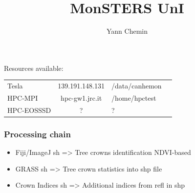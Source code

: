 \documentclass[serif,mathserif,aspectratio=169]{beamer}
\title[JRC\hspace{2em}\insertframenumber/\inserttotalframenumber]{MonSTERS UnI}
\author[Yann Chemin]{Yann Chemin}
\institute{JRC}
\date{} %
\begin{document}
{
\begin{frame}[plain]
\titlepage
\end{frame}}

\Large


\begin{frame}
 Resources available:
  
\begin{table}
\begin{tabular}{lclc}
 Tesla & 139.191.148.131 & /data/canhemon\\
 HPC-MPI & hpc-gw1.jrc.it & /home/hpctest\\
 HPC-EOSSSD & ? & ?\\
 \end{tabular}
\end{table}

\end{frame}


\begin{frame}
  \frametitle{Processing chain}
\begin{center}
\begin{itemize}
 \item Fiji/ImageJ sh => Tree crowns identification NDVI-based
 \item GRASS sh => Tree crown statistics into shp file
 \item Crown Indices sh => Additional indices from refl in shp
\end{itemize}
\end{center}
\end{frame}
\end{document}
